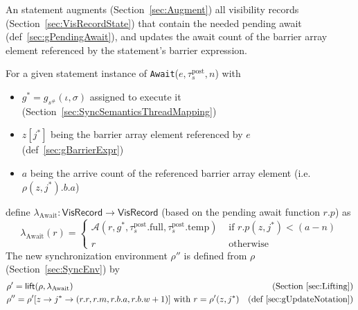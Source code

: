 

An  statement augments (Section~\ref{sec:Augment}) all visibility records (Section~\ref{sec:VisRecordState}) that contain the needed pending await (def~\ref{sec:gPendingAwait}), and updates the await count of the barrier array element referenced by the statement's barrier expression.

For a given statement instance of \texttt{Await}($e, \tau_s^\mathrm{post}, n$) with
\begin{itemize}
  \item $g^* = g_{s^\#}(\iota, \sigma)$ assigned to execute it (Section~\ref{sec:SyncSemanticsThreadMapping})
  \item $z[j^*]$ being the barrier array element referenced by $e$ (def~\ref{sec:gBarrierExpr})
  \item $a$ being the arrive count of the referenced barrier array element (i.e. $\rho(z, j^*).b.a$)
\end{itemize}
define $\lambda_\mathrm{Await}: \mathsf{VisRecord} \to \mathsf{VisRecord}$ (based on the pending await function $r.p$) as
\begin{equation*}
    \lambda_\mathrm{Await}(r) = \begin{cases}
        \mathcal{A}(r, g^*, \tau_s^\mathrm{post}.\mathrm{full}, \tau_s^\mathrm{post}.\mathrm{temp}) & \text{ if }
        r.p(z, j^*) < (a - n) \\
        r & \text{ otherwise }
    \end{cases}
\end{equation*}
The new synchronization environment $\rho''$ is defined from $\rho$ (Section~\ref{sec:SyncEnv}) by
\begin{align*}
  & \rho' = \mathsf{lift}(\rho, \lambda_\mathrm{Await}) & \text{(Section~\ref{sec:Lifting})} \\
  & \rho'' = \rho'[z \to j^* \to (r.r, r.m, r.b.a, r.b.w + 1)] \text{ with } r = \rho'(z, j^*) & \text{(def~\ref{sec:gUpdateNotation})}
\end{align*}


